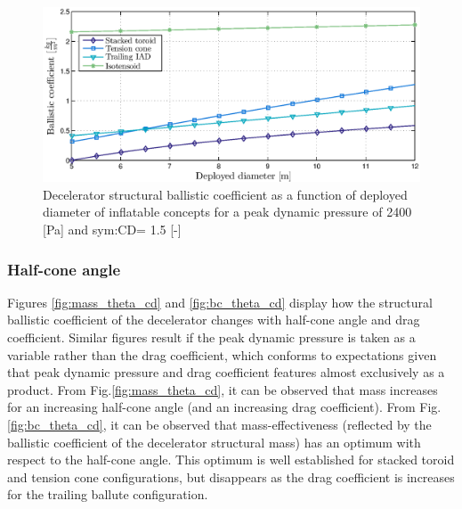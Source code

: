 \begin{figure}[H]
\centering
\includegraphics[width = 1.0\textwidth]{Figure/bc_diav2.eps}
\caption{Decelerator structural ballistic coefficient as a function of deployed diameter of inflatable concepts for a peak dynamic pressure of 2400 [Pa] and \gls{sym:CD}= 1.5 [-]}
\label{fig:bc_dia}
\end{figure}

\subsubsection{Half-cone angle}
Figures \ref{fig:mass_theta_cd} and \ref{fig:bc_theta_cd} display how the structural ballistic coefficient of the decelerator changes with half-cone angle and drag coefficient. Similar figures result if the peak dynamic pressure is taken as a variable rather than the drag coefficient, which conforms to expectations given that peak dynamic pressure and drag coefficient features almost exclusively as a product. From Fig.\ref{fig:mass_theta_cd}, it can be observed that mass increases for an increasing half-cone angle (and an increasing drag coefficient). From  Fig.\ref{fig:bc_theta_cd}, it can be observed that mass-effectiveness (reflected by the ballistic coefficient of the decelerator structural mass) has an optimum with respect to the half-cone angle. This optimum is well established for stacked toroid and tension cone configurations, but disappears as the drag coefficient is increases for the trailing ballute configuration.


